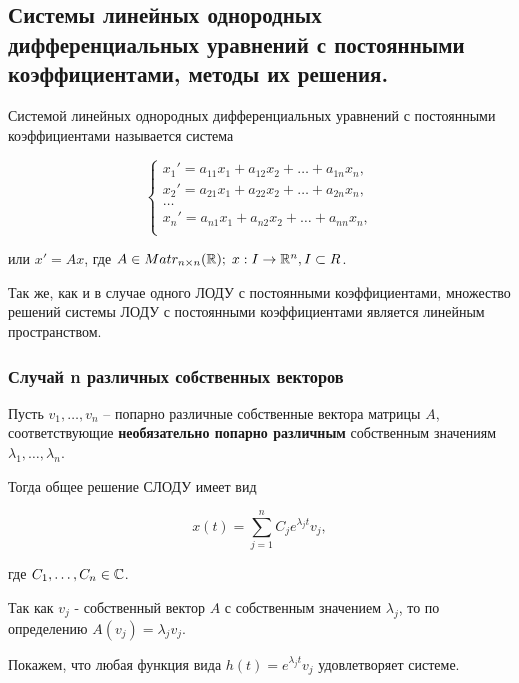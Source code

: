 \subsection{Системы линейных однородных дифференциальных уравнений с постоянными коэффициентами, методы их решения.}

\Def Системой линейных однородных дифференциальных уравнений с постоянными коэффициентами называется система

\begin{equation*}
    \begin{cases}
        x_1' = a_{11}x_1 + a_{12}x_2 + \dots + a_{1n}x_n, \\
        x_2' = a_{21}x_1 + a_{22}x_2 + \dots + a_{2n}x_n, \\
        \dots \\
        x_n' = a_{n1}x_1 + a_{n2}x_2 + \dots + a_{nn}x_n, \\
    \end{cases}
\end{equation*}

или $x' = Ax$, где $A\in Matr_{n \times n}(\mathbb{R});\; x: I \rightarrow \mathbb{R}^n, I \subset R$.

\Note Так же, как и в случае одного ЛОДУ с постоянными коэффициентами, множество решений системы ЛОДУ с постоянными коэффициентами является линейным пространством.

\subsubsection{Случай n различных собственных векторов}

\Th Пусть $v_1, \dots, v_n$ -- попарно различные собственные вектора матрицы $A$, соответствующие \textbf{необязательно попарно различным} собственным значениям $\lambda_1, \dots, \lambda_n$.

Тогда общее решение СЛОДУ имеет вид

\begin{equation*}
    x(t) = \sum_{j=1}^n C_j e^{\lambda_j t} v_j,
\end{equation*}

где $C_1, \dots, C_n \in \mathbb{C}$.

\Proof

Так как $v_j$ - собственный вектор $A$ с собственным значением $\lambda_j$, то по определению $A(v_j) = \lambda_j v_j$.

Покажем, что любая функция вида $h(t) = e^{\lambda_j t} v_j$ удовлетворяет системе.

